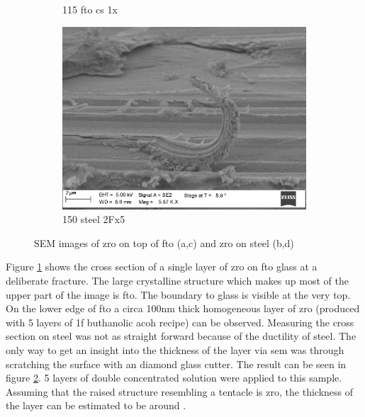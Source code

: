 \begin{figure}[htb]
\begin{subfigure}{.45\textwidth}
        \caption{115 fto cs 1x} \label{fig:sem-cs1}
    \end{subfigure}
    \begin{subfigure}{.45\textwidth}
        \centering
        \includegraphics[width=.8\textwidth]{Pics/sem/150_steel_cs_2Fx5.png}
        \caption{150 steel 2Fx5} \label{fig:sem-cs2}
    \end{subfigure}
    \caption{SEM images of \gls{zro} on top of \gls{fto} (a,c) and \gls{zro} on steel (b,d)} \label{fig:sem}
\end{figure}


Figure \ref{fig:sem-cs1} shows the cross section of a single layer of \gls{zro} on \gls{fto} glass at a deliberate fracture.
The large crystalline structure which makes up most of the upper part of the image is \gls{fto}. 
The boundary to glass is visible at the very top. 
On the lower edge of \gls{fto} a circa 100nm thick homogeneous layer of \gls{zro} (produced with 5 layers of \gls{1f} buthanolic \gls{acoh} recipe)  can be observed.
%
Measuring the cross section on steel was not as straight forward because of the ductility of steel. 
The only way to get an insight into the thickness of the layer via \gls{sem} was through 
scratching the surface with an diamond glass cutter. 
The result can be seen in figure \ref{fig:sem-cs2}. 
5 layers of double concentrated solution were applied to this sample. 
Assuming that the raised structure resembling a tentacle is \gls{zro}, 
the thickness of the layer can be estimated to be around .

